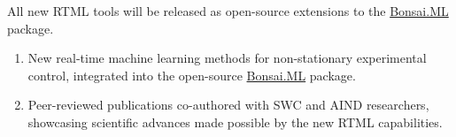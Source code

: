All new RTML tools will be released as open-source extensions to the \href{https://bonsai-rx.org/machinelearning/}{Bonsai.ML} package.


\begin{enumerate}
    \item New real-time machine learning methods for non-stationary experimental control, integrated into the open-source \href{https://bonsai-rx.org/machinelearning/}{Bonsai.ML} package.
    \item Peer-reviewed publications co-authored with SWC and AIND researchers, showcasing scientific advances made possible by the new RTML capabilities.
\end{enumerate}

